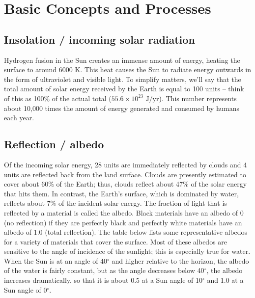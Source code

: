 \documentclass[11pt,letterpaper]{article}
\begin{document}
\section{Basic Concepts and Processes}
\subsection{Insolation / incoming solar radiation}
Hydrogen fusion in the Sun creates an immense amount of energy, heating the surface to around 6000 K. This heat causes the Sun to radiate energy outwards in the form of ultraviolet and visible light. To simplify matters, we'll say that the total amount of solar energy received by the Earth is equal to 100 units -- think of this as 100\% of the actual total ($55.6\times{10}^{23}\mbox{ J/yr}$). This number represents about 10,000 times the amount of energy generated and consumed by humans each year.

\subsection{Reflection / albedo}
Of the incoming solar energy, 28 units are immediately reflected by clouds and 4 units are reflected back from the land
surface. Clouds are presently estimated to cover about 60\% of the Earth; thus, clouds reflect about 47\% of the solar energy that hits them. In contrast, the Earth's surface, which is dominated by water, reflects about 7\% of the incident solar energy. The fraction of light that is reflected by a material is called the albedo. Black materials
have an albedo of 0 (no reflection) if they are perfectly black and perfectly white materials have an albedo of 1.0 (total reflection). The
table below lists some representative albedos for a variety of materials that cover the surface. Most of these albedos are sensitive to the
angle of incidence of the sunlight; this is especially true for water. When the Sun is at an angle of 40$^\circ$ and higher relative to the horizon, the albedo of the water is fairly constant, but as the angle decreases below 40$^\circ$, the albedo increases dramatically, so that it is about 0.5 at a Sun angle of 10$^\circ$ and 1.0 at a Sun angle of 0$^\circ$.
\end{document}
